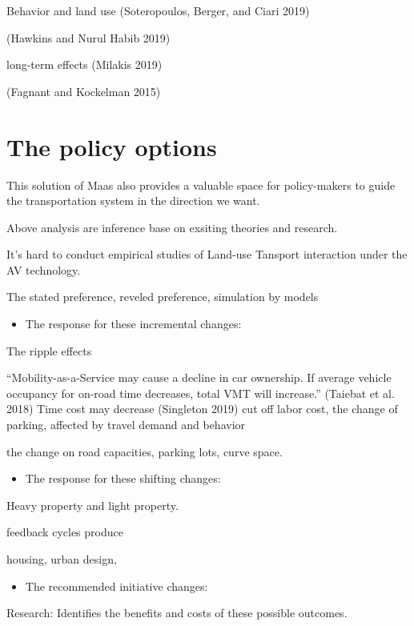 \documentclass[12pt,]{article}
\providecommand{\tightlist}{%
  \setlength{\itemsep}{0pt}\setlength{\parskip}{0pt}}
\begin{document}
Behavior and land use (Soteropoulos, Berger, and Ciari 2019)

(Hawkins and Nurul Habib 2019)

long-term effects (Milakis 2019)

(Fagnant and Kockelman 2015)

\hypertarget{the-policy-options}{%
\section{The policy options}\label{the-policy-options}}

This solution of Maas also provides a valuable space for policy-makers
to guide the transportation system in the direction we want.

Above analysis are inference base on exsiting theories and research.

It's hard to conduct empirical studies of Land-use Tansport interaction
under the AV technology.

The stated preference, reveled preference, simulation by models

\begin{itemize}
\tightlist
\item
  The response for these incremental changes:
\end{itemize}

The ripple effects

``Mobility-as-a-Service may cause a decline in car ownership. If average
vehicle occupancy for on-road time decreases, total VMT will increase.''
(Taiebat et al. 2018) Time cost may decrease (Singleton 2019) cut off
labor cost, the change of parking, affected by travel demand and
behavior

the change on road capacities, parking lots, curve space.

\begin{itemize}
\tightlist
\item
  The response for these shifting changes:
\end{itemize}

Heavy property and light property.

feedback cycles produce

housing, urban design,

\begin{itemize}
\tightlist
\item
  The recommended initiative changes:
\end{itemize}

Research: Identifies the benefits and costs of these possible outcomes.
\end{document}
